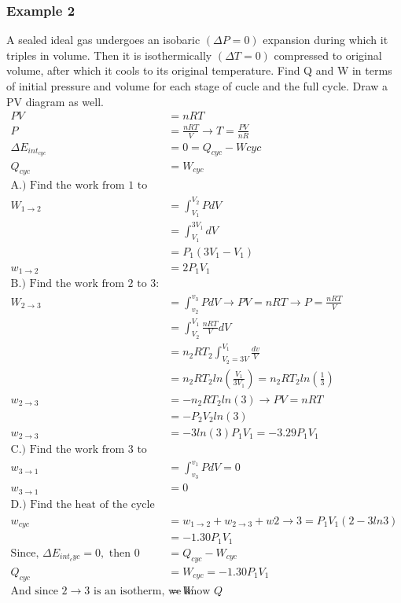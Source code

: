 	\subsubsection{Example 2}
	A sealed ideal gas undergoes an isobaric $(\Delta P=0)$ expansion during which it triples in volume. Then it is isothermically $(\Delta T=0)$ compressed to original volume, after which it cools to its original temperature. Find Q and W in terms of initial pressure and volume for each stage of cucle and the full cycle. Draw a PV diagram as well.
	\begin{align*}
	PV&=nRT\\
	P&=\frac{nRT}{V}\to T=\frac{PV}{nR}\\
	\Delta E_{int_{cyc}}&=0=Q_{cyc}-W{cyc}\\
	Q_{cyc}&=W_{cyc}\\
	\text{A.) Find the work from 1 to 2:}\\
	W_{1\to2}&=\int_{V_1}^{V_2}{PdV}\\
	&=\int_{V_1}^{3V_1}{dV}\\
	&=P_1(3V_1-V_1)\\
	w_{1\to2}&=2P_1V_1\\
	\text{B.) Find the work from 2 to 3:}\\
	W_{2\to3}&=\int_{v_2}^{v_3}PdV \to PV=nRT \to P=\frac{nRT}{V}\\
	&=\int_{V_2}^{V_1}{\frac{nRT}{V}dV}\\
	&=n_2RT_2\int_{V_2=3V}^{V_1}{\frac{dv}{V}}\\
	&=n_2RT_2ln\left(\frac{V_1}{3V_1}\right)=n_2RT_2ln\left(\frac{1}{3}\right)\\
	w_{2\to3}&=-n_2RT_2ln(3) \to PV=nRT\\
	&=-P_2V_2ln(3)\\
	w_{2\to3}&=-3ln(3)P_1V_1=-3.29P_1V_1\\
	\text{C.) Find the work from 3 to 1:}\\
	w_{3\to1} &= \int_{v_3}^{v_1}{PdV}=0\\
	w_{3\to1} &= 0\\
	\text{D.) Find the heat of the cycle}\\
	w_{cyc}&=w_{1\to2}+w_{2\to3}+w{2\to3}=P_1V_1(2-3ln3)\\
	&= -1.30P_1V_1\\
	\text{Since, } \Delta E_{int_cyc}=0, \text{ then } 0&=Q_{cyc}-W_{cyc}\\
	Q_{cyc}&=W_{cyc}=-1.30P_1V_1\\
	\text{And since }2\to3\text{ is an isotherm, we know } Q&=W\\

\end{align*}
